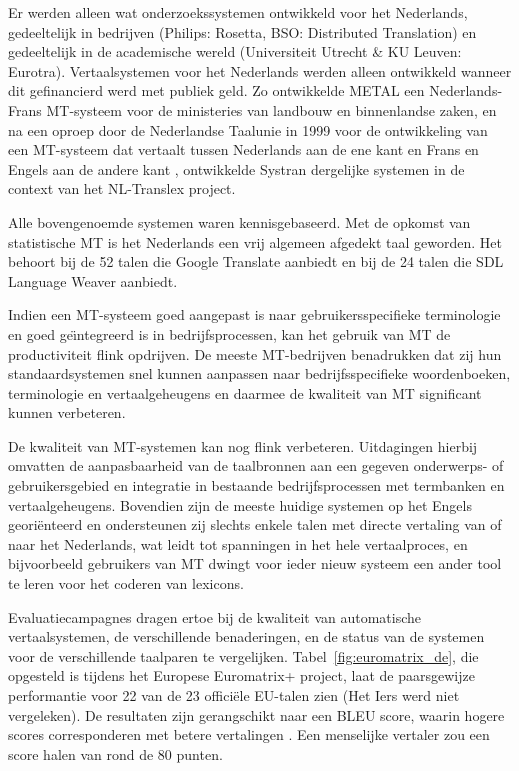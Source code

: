 \documentclass[]{../../metanetpaper}
\begin{document}
\begin{multicols}{2}
\begin{figure}[tb]
\end{figure}
%
 Er werden alleen wat onderzoekssystemen ontwikkeld voor het Nederlands, gedeeltelijk in bedrijven (Philips: Rosetta, BSO: Distributed Translation) en gedeeltelijk in de academische wereld (Universiteit Utrecht \& KU Leuven: Eurotra). Vertaalsystemen voor het Nederlands werden alleen ontwikkeld wanneer dit gefinancierd werd met publiek geld. Zo ontwikkelde METAL een Nederlands-Frans MT-systeem voor de ministeries van landbouw en binnenlandse zaken, en na een oproep door de Nederlandse Taalunie in 1999 voor de ontwikkeling van een MT-systeem dat vertaalt tussen Nederlands aan de ene kant en Frans en Engels aan de andere kant \cite{Cucchiarini:etal:2000}, ontwikkelde Systran dergelijke systemen in de context van het NL-Translex project.

    Alle bovengenoemde systemen waren kennisgebaseerd. Met de opkomst van statistische MT is het Nederlands een vrij algemeen afgedekt taal geworden. Het behoort bij de 52 talen die Google Translate aanbiedt en bij de 24 talen die SDL Language Weaver aanbiedt.

    Indien een MT-systeem goed aangepast is naar gebruikersspecifieke terminologie en goed ge{\"\i}ntegreerd is in bedrijfsprocessen, kan het gebruik van MT de productiviteit flink opdrijven. De meeste MT-bedrijven benadrukken dat zij hun standaardsystemen snel kunnen aanpassen naar bedrijfsspecifieke woordenboeken, terminologie en vertaalgeheugens en daarmee de kwaliteit van MT significant kunnen verbeteren.

    De kwaliteit van MT-systemen kan nog flink verbeteren. Uitdagingen hierbij omvatten de aanpasbaarheid van de taalbronnen aan een gegeven onderwerps- of gebruikersgebied en integratie in bestaande bedrijfsprocessen met termbanken en vertaalgeheugens. Bovendien zijn de meeste huidige systemen op het Engels geori{\"e}nteerd en ondersteunen zij slechts enkele talen met directe vertaling van of naar het Nederlands, wat leidt tot spanningen in het hele vertaalproces, en bijvoorbeeld gebruikers van MT dwingt voor ieder nieuw systeem een ander tool te leren voor het coderen van lexicons.


    Evaluatiecampagnes dragen ertoe bij de kwaliteit van automatische vertaalsystemen, de verschillende benaderingen, en de status van de systemen voor de verschillende taalparen te vergelijken. Tabel~\ref{fig:euromatrix_de}, die opgesteld is tijdens het Europese Euromatrix+ project, laat de paarsgewijze performantie voor 22 van de 23 offici{\"e}le EU-talen zien (Het Iers werd niet vergeleken). De resultaten zijn gerangschikt naar een BLEU score, waarin hogere scores corresponderen met betere vertalingen \cite{bleu1}.   Een menselijke vertaler zou een score halen van rond de 80 punten.


\end{multicols}
\end{document}
